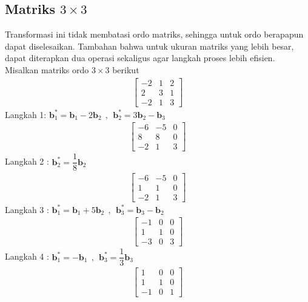 \documentclass{article}   %
\begin{document}
		\subsection{Matriks $3\times3$}
		Transformasi ini tidak membatasi ordo matriks, sehingga untuk ordo berapapun dapat diselesaikan. Tambahan bahwa untuk ukuran matriks yang lebih besar, dapat diterapkan dua operasi sekaligus agar langkah proses lebih efisien. Misalkan matriks ordo $3\times3$ berikut
				\begin{align*}
		\left[
		\begin{array}{rrr} 
			-2 & 1 & 2\\
			2 & 3 & 1\\
			-2 &1 & 3 
		\end{array} 
		\right]
	\end{align*}
Langkah 1: $\textbf{b}^*_1= \textbf{b}_1 - 2\textbf{b}_2~~,~~\textbf{b}^*_2= 3\textbf{b}_2 - \textbf{b}_3$ \\
\begin{align*}
\left[
\begin{array}{rrr} 
	-6 & -5 & 0\\
	8 & 8 & 0\\
	-2 &1 & 3 
\end{array} 
\right]
\end{align*}
Langkah 2 : $\textbf{b}^*_2= \dfrac{1}{8}\textbf{b}_2$ \\
\begin{align*}
\left[
\begin{array}{rrr} 
	-6 & -5 & 0\\
	1 & 1 & 0\\
	-2 &1 & 3 
\end{array} 
\right]
\end{align*}
Langkah 3 : $\textbf{b}^*_1= \textbf{b}_1 + 5\textbf{b}_2~~,~~\textbf{b}^*_3= \textbf{b}_3 - \textbf{b}_2$ \\
\begin{align*}
\left[
\begin{array}{rrr} 
	-1 & 0 & 0\\
	1 & 1 & 0\\
	-3 &0 & 3 
\end{array} 
\right]
\end{align*}
Langkah 4 : $\textbf{b}^*_1= -\textbf{b}_1~~,~~\textbf{b}^*_3= \dfrac{1}{3}\textbf{b}_3$ \\
\begin{align*}
	\left[
	\begin{array}{rrr} 
		1 & 0 & 0\\
		1 & 1 & 0\\
		-1 &0 & 1 
	\end{array} 
	\right]
\end{align*}
\end{document}
